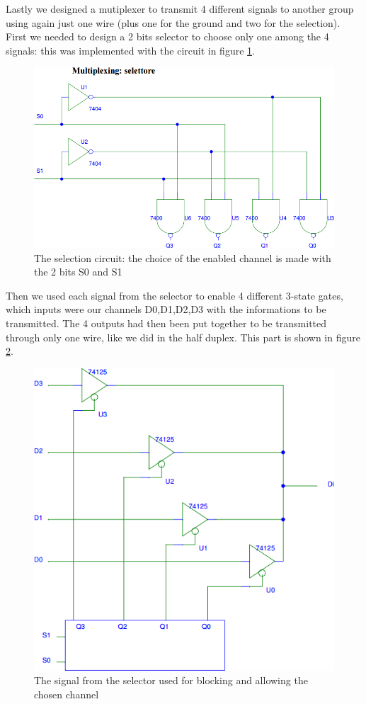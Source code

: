 Lastly we designed a mutiplexer to transmit 4 different signals to another group using again just one wire (plus one for the ground and two for the selection). First we needed to design a 2 bits selector to choose only one among the 4 signals: this was implemented with the circuit in figure \ref{multi_select}.
\begin{figure}[H]
\centering
\includegraphics[width=.7\textwidth]{10/multi_select.png}
\caption{The selection circuit: the choice of the enabled channel is made with the 2 bits S0 and S1}\label{multi_select}
\end{figure}
Then we used each signal from the selector to enable 4 different 3-state gates, which inputs were our channels D0,D1,D2,D3 with the informations to be transmitted. The 4 outputs had then been put together to be transmitted through only one wire, like we did in the half duplex. This part is shown in figure \ref{multi_wired}.
\begin{figure}[H]
\centering
\includegraphics[width=.7\textwidth]{10/multi_wired.png}
\caption{The signal from the selector used for blocking and allowing the chosen channel}\label{multi_wired}
\end{figure}
